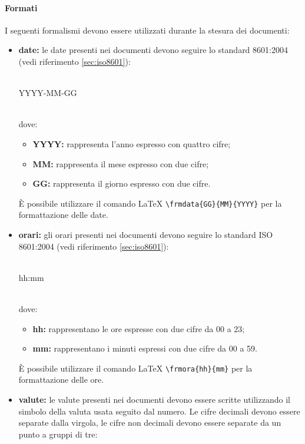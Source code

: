                 \paragraph{Formati}\label{sec:formati}
                I seguenti formalismi devono essere utilizzati durante la stesura dei documenti:
                \begin{itemize}
                    \item \textbf{date:} le date presenti nei documenti devono seguire lo standard  8601:2004 (vedi riferimento \ref{sec:iso8601}):\\\\
                    \centerline{YYYY-MM-GG}\\
                    dove:
                    \begin{itemize}
                        \item \textbf{YYYY:} rappresenta l'anno espresso con quattro cifre;
                        \item \textbf{MM:} rappresenta il mese espresso con due cifre;
                        \item \textbf{GG:} rappresenta il giorno espresso con due cifre.
                    \end{itemize}
                    È possibile utilizzare il comando \LaTeX{} \texttt{\textbackslash frmdata\{GG\}\{MM\}\{YYYY\}} per la formattazione delle date.
                    \item \textbf{orari:} gli orari presenti nei documenti devono seguire lo standard ISO 8601:2004 (vedi riferimento \ref{sec:iso8601}):\\\\
                    \centerline{hh:mm}\\
                    dove:
                    \begin{itemize}
                        \item \textbf{hh:} rappresentano le ore espresse con due cifre da 00 a 23;
                        \item \textbf{mm:} rappresentano i minuti espressi con due cifre da 00 a 59.
                    \end{itemize}
                    È possibile utilizzare il comando \LaTeX{} \texttt{\textbackslash frmora\{hh\}\{mm\}} per la formattazione delle ore.
                    \item \textbf{valute:} le valute presenti nei documenti devono essere scritte utilizzando il simbolo della valuta usata seguito dal numero. Le cifre decimali devono essere separate dalla virgola, le cifre non decimali devono essere separate da un punto a gruppi di tre:

\end{itemize}
